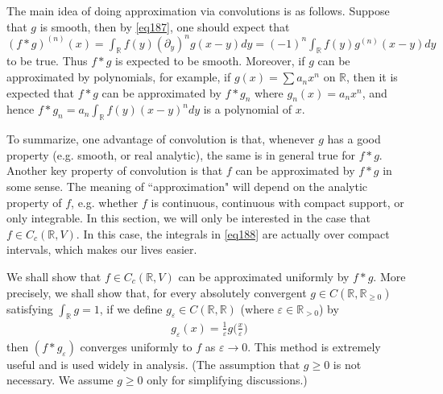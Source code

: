 \documentclass[12pt,b5paper,notitlepage]{article}
\theoremstyle{definition}
\newtheorem{ass}[df]{Assumption}
\theoremstyle{plain}
\newcommand{\Rbb}{\mathbb R}
\newcommand{\eps}{\varepsilon}
\numberwithin{equation}{section}
\begin{document}
The main idea of doing approximation via convolutions is as follows. Suppose that $g$ is smooth, then by \eqref{eq187}, one should expect that $(f*g)^{(n)}(x)=\int_\Rbb f(y)(\partial_y)^ng(x-y)dy=(-1)^n\int_\Rbb f(y)g^{(n)}(x-y)dy$ to be true. Thus $f*g$ is expected to be smooth. Moreover, if $g$ can be approximated by polynomials, for example, if $g(x)=\sum a_nx^n$ on $\Rbb$, then it is expected that $f*g$ can be approximated by $f*g_n$ where $g_n(x)=a_nx^n$, and hence $f*g_n=a_n\int_\Rbb f(y)(x-y)^ndy$ is a polynomial of $x$.

To summarize, one advantage of convolution is that, whenever $g$ has a good property (e.g. smooth, or real analytic), the same is in general true for $f*g$. Another key property of convolution is that $f$ can be approximated by $f*g$ in some sense. The meaning of ``approximation" will depend on the analytic property of $f$, e.g. whether $f$ is continuous, continuous with compact support, or only integrable. In this section, we will only be interested in the case that $f\in C_c(\Rbb,V)$. In this case, the integrals in \eqref{eq188} are actually over compact intervals, which makes our lives easier. 

We shall show that $f\in C_c(\Rbb,V)$ can be approximated uniformly by $f*g$. More precisely, we shall show that, for every absolutely convergent $g\in C(\Rbb,\Rbb_{\geq0})$ satisfying $\int_\Rbb g=1$, if we define $g_\eps\in C(\Rbb,\Rbb)$ (where $\eps\in\Rbb_{>0}$) by
\begin{align}
g_\eps(x)=\frac 1\eps g\big(\frac x\eps\big)  \label{eq189}
\end{align}
then $(f*g_\eps)$ converges uniformly to $f$ as $\eps\rightarrow 0$. This method is extremely useful and is used widely in analysis. (The assumption that $g\geq0$ is not necessary. We assume $g\geq0$ only for simplifying discussions.)


\begin{comment}
\begin{ass}\label{lb434}
$g:\Rbb\rightarrow\Rbb_{\geq0}$ satisfies one of the following two conditions:
\begin{enumerate}[label=(\alph*)]
\item $g\in C_c(\Rbb,\Rbb_{\geq0})$ and $\int_\Rbb g=1$.
\item $g\in C(\Rbb,\Rbb_{\geq0})$, and $g(x)\geq g(y)$ whenever $0\leq x\leq y$, and $\int_\Rbb g=1$.
\end{enumerate}
\end{ass}

Condition (a) is convenient. 

\end{comment}
\end{document}
